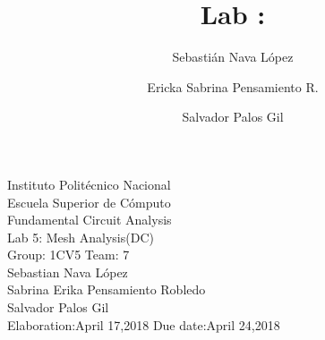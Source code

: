 \documentclass[letterpaper]{article}
\title{Lab :}
\author{
    Sebastián Nava López\\
    \and
    Ericka Sabrina Pensamiento R.\\
    \and
    Salvador Palos Gil
}
\begin{document}
\begin{titlepage}
    \centering
    {\Huge Instituto Politécnico Nacional}\\[3ex]
    {\huge Escuela Superior de Cómputo}\\[8ex]
    {\huge Fundamental Circuit Analysis}\\[12ex]
    {\Large Lab 5: Mesh Analysis(DC)}\\[20ex]
    {\Large Group: 1CV5 Team: 7 \\[8ex]
    Sebastian Nava López\\[4ex]
    Sabrina Erika Pensamiento Robledo\\[4ex]
    Salvador Palos Gil\\[18ex]
    }
    \large{Elaboration:April 17,2018 \hspace{8em} Due date:April 24,2018}
\end{titlepage}
\tableofcontents
\newpage
\end{document}
